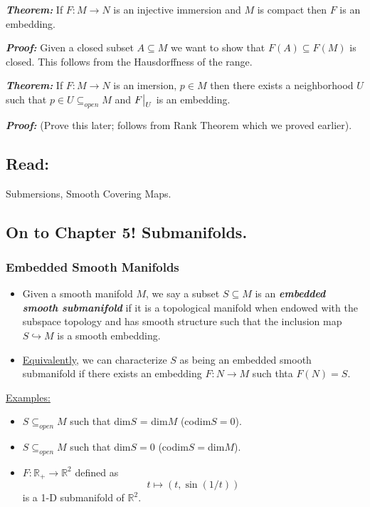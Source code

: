 \documentclass{article}
\newcommand{\R}{\mathbb{R}}
\newcommand{\restr}[2]{{%
  \left.\kern-\nulldelimiterspace %
  #1 %
  \vphantom{\big|} %
  \right|_{#2} %
  }}
\begin{document}
\vsize 0.5cm
\begin{dottedbox}
  \emph{\textbf{Theorem:}} If $F : M \rightarrow N$ is an injective immersion and $M$ is compact then $F$ is an embedding. 
\end{dottedbox}

\vsize 0.5cm
\emph{\textbf{Proof:}} Given a closed subset $A \subseteq M$ we want to show that $F(A) \subseteq F(M)$ is closed. This follows from the Hausdorffness of the range.

\vsize 0.5cm
\begin{dottedbox}
  \emph{\textbf{Theorem:}} If $F : M \rightarrow N$ is an imersion, $p \in M$ then there exists a neighborhood $U$ such that $p \in U \subseteq_{open} M$ and $\restr{F}{U}$ is an embedding.
\end{dottedbox}

\textbf{\emph{Proof:}} (Prove this later; follows from Rank Theorem which we proved earlier).

\vsize 0.5cm
\subsection*{Read:} Submersions, Smooth Covering Maps.

\vsize 1cm
\subsection{On to Chapter 5! Submanifolds.}

\subsubsection{Embedded Smooth Manifolds}

\begin{mathdefinitionbox}{}
  \begin{itemize}
    \item Given a smooth manifold $M$, we say a subset $S \subseteq M$ is an \emph{\textbf{embedded smooth submanifold}} if it is a topological manifold when endowed with the subspace topology and has smooth structure such that the inclusion map $S \hookrightarrow M$ is a smooth embedding.
    \item\underline{Equivalently}, we can characterize $S$ as being an embedded smooth submanifold if there exists an embedding $F : N \rightarrow M$ such thta $F(N) = S$.
  \end{itemize}
\end{mathdefinitionbox}

\vsize 0.5cm
\underline{Examples:}
\begin{itemize}
  \item $S \subseteq_{open} M$ such that dim$S$ = dim$M$ (codim$S = 0$).
  \item $S \subseteq_{open} M$ such that dim$S = 0$ (codim$S = $dim$M$).
  \item $F : \R_{+} \rightarrow \R^2$ defined as 
  \[ t \mapsto \left( t, \sin(1/t) \right) \] is a 1-D submanifold of $\R^2$.
\end{itemize}
\end{document}
